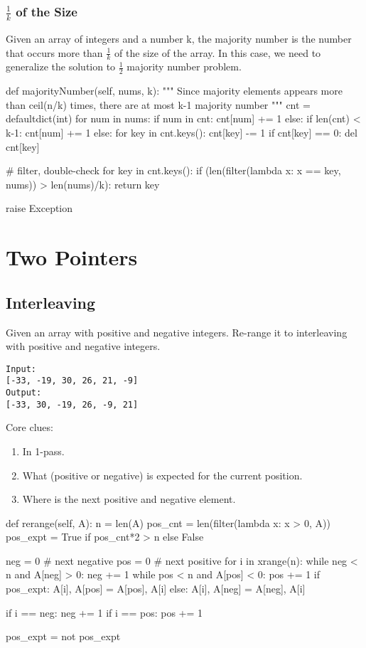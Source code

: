 \subsubsection{$\frac{1}{k}$ of the Size}
Given an array of integers and a number k, the majority number is the number that occurs more than $\frac{1}{k}$ of the size of the array. In this case, we need to generalize the solution to $\frac{1}{2}$ majority number problem.
\newpag
\begin{python}

def majorityNumber(self, nums, k):
    """
    Since majority elements appears more 
    than ceil(n/k) times, there are at 
    most k-1 majority number
    """
    cnt = defaultdict(int)
    for num in nums:
        if num in cnt:
            cnt[num] += 1
        else:
            if len(cnt) < k-1:
                cnt[num] += 1
            else:
                for key in cnt.keys():
                    cnt[key] -= 1
                    if cnt[key] == 0: del cnt[key]
    
    
    # filter, double-check
    for key in cnt.keys():
        if (len(filter(lambda x: x == key, nums)) 
            > len(nums)/k):
            return key

    raise Exception
\end{python}


\section{Two Pointers}
\subsection{Interleaving}
 Given an array with positive and negative integers. Re-range it to interleaving with positive and negative integers.
\begin{lstlisting}
Input:
[-33, -19, 30, 26, 21, -9]
Output:
[-33, 30, -19, 26, -9, 21]
\end{lstlisting}
Core clues:
\begin{enumerate}
\item In 1-pass.
\item What (positive or negative) is expected for the current position.
\item Where is the next positive and negative element.
\end{enumerate}
\begin{python}
def rerange(self, A):
    n = len(A)
    pos_cnt = len(filter(lambda x: x > 0, A))
    pos_expt = True if pos_cnt*2 > n else False

    neg = 0  # next negative
    pos = 0  # next positive
    for i in xrange(n):
        while neg < n and A[neg] > 0: neg += 1
        while pos < n and A[pos] < 0: pos += 1
        if pos_expt:
            A[i], A[pos] = A[pos], A[i]
        else:
            A[i], A[neg] = A[neg], A[i]

        if i == neg: neg += 1
        if i == pos: pos += 1

        pos_expt = not pos_expt
\end{python}

